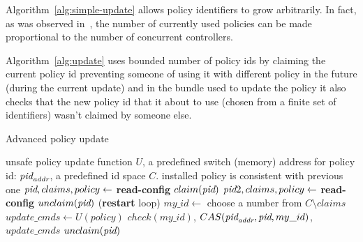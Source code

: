\documentclass[conference]{sigcomm-alternate}
\newcommand{\hide}[1]{}
\newcommand{\claimcheck}{check\xspace}
\newcommand{\addr}{\emph{addr}\xspace}
\newcommand{\pid}{\emph{pid}\xspace}
\newcommand{\ufunc}{U} %
\begin{document}
{\begin{algorithm}[h]
\begin{algorithmic}[1]
    \end{algorithmic}
\end{algorithm}


Algorithm~\ref{alg:simple-update} allows policy identifiers to grow
arbitrarily. In fact, as was observed in~\cite{cpc}, the number of currently
used policies can be made proportional to the number of concurrent
controllers.


\hide{
It takes a set of rules $U$ (not yet a policy)and proceeds as follows: first, we seek to
 obtain a unique \emph{id}. FIXME: to be continued...
 \textbf{LS: I am not sure if I need to tell every step of the story or maybe it best to explain the main dif from the previous one similarly to what I just wrote next}.
}

Algorithm~\ref{alg:update} uses bounded number of policy ids by claiming the current policy id preventing someone of using it with different policy in the future (during the current update) and in the bundle used to update the policy it also checks that the new policy id that it about to use (chosen from a finite set of identifiers) wasn't claimed by someone else.

\hide{
We compute our new suggested policy by applying the update requests on top of current policy, supporting any kind of requests and policies. Then we make a transaction (using the bundle feature) to atomically check that our policy id is not blocked by anyone else, to change the current policy id to ours (an action that would fail if the current policy id is no longer what we are counting of) and to actually configure our new policy.

If one of the actions in the transaction fails we try again. There is no progress guaranty for each controller but there is one for the whole system - at least one of the controller will succeed in fulfilling its update requirements.
}

\begin{algorithm}[h]
    \caption{Advanced policy update}
    \label{alg:update}
    \begin{algorithmic}[1]
        \Require unsafe policy update function $\ufunc$, a predefined switch (memory) address for policy id: $\pid_{\addr}$, a predefined id space $C$.
    \Ensure installed policy is consistent with previous one
 		\Repeat
		 	\State $\pid,claims,policy\gets$ \textbf{read-config} %
 			\State $claim(\pid)$
 			\State $\pid 2,claims,policy\gets$ \textbf{read-config} %
 			\If {$\pid\neq \pid 2$}
	 			\State $unclaim(\pid)$
 				 (\textbf{restart} loop)
 			\EndIf
 			\State $my\_id\gets$ choose a number from $C\setminus claims$
 			\State $update\_cmds\gets \ufunc(policy)$
 			\startTxn
 				\State $\claimcheck(my\_id)$,
	 			\State $CAS(\pid_{\addr}, \pid,my\_id)$,
	 			\State $update\_cmds$ %
 			\endTxn
	 		\State $unclaim(\pid)$
			\Return


\end{algorithmic}
\end{algorithm}}
\end{document}
